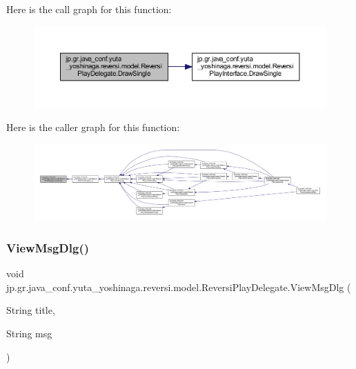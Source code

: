 Here is the call graph for this function\+:
\nopagebreak
\begin{figure}[H]
\begin{center}
\leavevmode
\includegraphics[width=350pt]{classjp_1_1gr_1_1java__conf_1_1yuta__yoshinaga_1_1reversi_1_1model_1_1_reversi_play_delegate_ab72825782a2d5cfce2ddeb0add42143e_cgraph}
\end{center}
\end{figure}
Here is the caller graph for this function\+:
\nopagebreak
\begin{figure}[H]
\begin{center}
\leavevmode
\includegraphics[width=350pt]{classjp_1_1gr_1_1java__conf_1_1yuta__yoshinaga_1_1reversi_1_1model_1_1_reversi_play_delegate_ab72825782a2d5cfce2ddeb0add42143e_icgraph}
\end{center}
\end{figure}
\mbox{\label{classjp_1_1gr_1_1java__conf_1_1yuta__yoshinaga_1_1reversi_1_1model_1_1_reversi_play_delegate_acdb644250451a30317ce0518191292a5}} 
\subsubsection{\texorpdfstring{View\+Msg\+Dlg()}{ViewMsgDlg()}}
{\footnotesize\ttfamily void jp.\+gr.\+java\+\_\+conf.\+yuta\+\_\+yoshinaga.\+reversi.\+model.\+Reversi\+Play\+Delegate.\+View\+Msg\+Dlg (\begin{DoxyParamCaption}\item[{String}]{title,  }\item[{String}]{msg }\end{DoxyParamCaption})}



